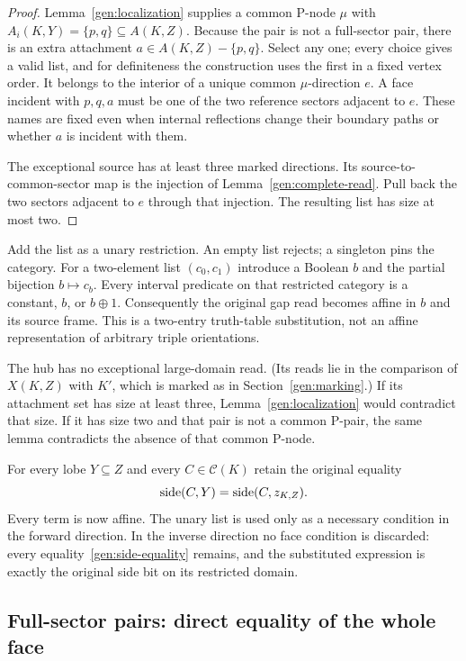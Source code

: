 \begin{proof}
Lemma~\ref{gen:localization} supplies a common P-node $\mu$ with
$A_i(K,Y)=\{p,q\}\subseteq A(K,Z)$.  Because the pair is not a
full-sector pair, there is an extra attachment
$a\in A(K,Z)-\{p,q\}$.  Select any one; every choice gives a valid list,
and for definiteness the construction uses the first in a fixed vertex
order.  It belongs to the interior of a unique
common $\mu$-direction $e$.  A face incident with $p,q,a$ must be
one of the two reference sectors adjacent to $e$.  These names are
fixed even when internal reflections change their boundary paths or
whether $a$ is incident with them.

The exceptional source has at least three marked directions.  Its
source-to-common-sector map is the injection of
Lemma~\ref{gen:complete-read}.  Pull back the two sectors adjacent to
$e$ through that injection.  The resulting list has size at most two.
\end{proof}

Add the list as a unary restriction.  An empty list rejects; a singleton
pins the category.  For a two-element list $(c_0,c_1)$ introduce a Boolean
$b$ and the partial bijection $b\mapsto c_b$.  Every interval predicate
on that restricted category is a constant, $b$, or $b\oplus1$.
Consequently the original gap read becomes affine in $b$ and its source
frame.  This is a two-entry truth-table substitution, not an affine
representation of arbitrary triple orientations.

The hub has no exceptional large-domain read.  (Its reads lie in the
comparison of $X(K,Z)$ with $K'$, which is marked as in
Section~\ref{gen:marking}.)  If its attachment set has
size at least three, Lemma~\ref{gen:localization} would contradict that
size.  If it has size two and that pair is not a common P-pair, the same
lemma contradicts the absence of that common P-node.

For every lobe $Y\subseteq Z$ and every $C\in\mathcal C(K)$ retain the
original equality
\begin{equation}
 \operatorname{side}(C,Y)=\operatorname{side}(C,z_{K,Z}).
 \label{gen:side-equality}
\end{equation}
Every term is now affine.  The unary list is used only as a necessary
condition in the forward direction.  In the inverse direction no face
condition is discarded: every equality~\eqref{gen:side-equality} remains,
and the substituted expression is exactly the original side bit on its
restricted domain.

\subsection{Full-sector pairs: direct equality of the whole face}

